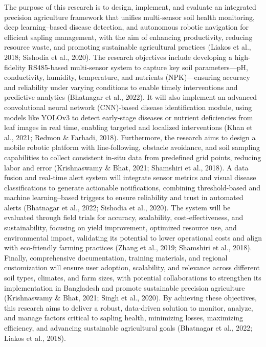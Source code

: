 \documentclass{book} %
\begin{document}
\noindent The purpose of this research is to design, implement, and evaluate an integrated precision agriculture framework that unifies multi-sensor soil health monitoring, deep learning--based disease detection, and autonomous robotic navigation for efficient sapling management, with the aim of enhancing productivity, reducing resource waste, and promoting sustainable agricultural practices (Liakos et al., 2018; Sishodia et al., 2020). The research objectives include developing a high-fidelity RS485-based multi-sensor system to capture key soil parameters---pH, conductivity, humidity, temperature, and nutrients (NPK)---ensuring accuracy and reliability under varying conditions to enable timely interventions and predictive analytics (Bhatnagar et al., 2022). It will also implement an advanced convolutional neural network (CNN)-based disease identification module, using models like YOLOv3 to detect early-stage diseases or nutrient deficiencies from leaf images in real time, enabling targeted and localized interventions (Khan et al., 2021; Redmon \& Farhadi, 2018). Furthermore, the research aims to design a mobile robotic platform with line-following, obstacle avoidance, and soil sampling capabilities to collect consistent in-situ data from predefined grid points, reducing labor and error (Krishnaswamy \& Bhat, 2021; Shamshiri et al., 2018). A data fusion and real-time alert system will integrate sensor metrics and visual disease classifications to generate actionable notifications, combining threshold-based and machine learning--based triggers to ensure reliability and trust in automated alerts (Bhatnagar et al., 2022; Sishodia et al., 2020). The system will be evaluated through field trials for accuracy, scalability, cost-effectiveness, and sustainability, focusing on yield improvement, optimized resource use, and environmental impact, validating its potential to lower operational costs and align with eco-friendly farming practices (Zhang et al., 2019; Shamshiri et al., 2018). Finally, comprehensive documentation, training materials, and regional customization will ensure user adoption, scalability, and relevance across different soil types, climates, and farm sizes, with potential collaborations to strengthen its implementation in Bangladesh and promote sustainable precision agriculture (Krishnaswamy \& Bhat, 2021; Singh et al., 2020). By achieving these objectives, this research aims to deliver a robust, data-driven solution to monitor, analyze, and manage factors critical to sapling health, minimizing losses, maximizing efficiency, and advancing sustainable agricultural goals (Bhatnagar et al., 2022; Liakos et al., 2018).
\end{document}
